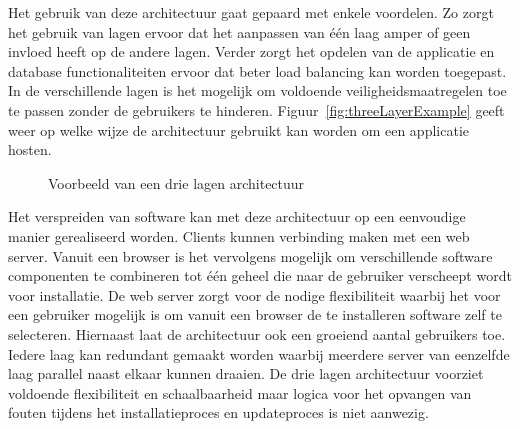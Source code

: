 Het gebruik van deze architectuur gaat gepaard met enkele voordelen.
Zo zorgt het gebruik van lagen ervoor dat het aanpassen van één laag amper of geen invloed heeft op de andere lagen.
Verder zorgt het opdelen van de applicatie en database functionaliteiten ervoor dat beter load balancing kan worden toegepast.
In de verschillende lagen is het mogelijk om voldoende veiligheidsmaatregelen toe te passen zonder de gebruikers te hinderen.
Figuur~\vref{fig:threeLayerExample} geeft weer op welke wijze de architectuur gebruikt kan worden om een applicatie hosten.

\begin{figure}[!ht]
\centering
{}
\caption{Voorbeeld van een drie lagen architectuur \citep{hanson2000client}}
\label{fig:threeLayerExample}
\end{figure}

Het verspreiden van software kan met deze architectuur op een eenvoudige manier gerealiseerd worden.
Clients kunnen verbinding maken met een web server.
Vanuit een browser is het vervolgens mogelijk om verschillende software componenten te combineren tot één geheel die naar de gebruiker verscheept wordt voor installatie.
De web server zorgt voor de nodige flexibiliteit waarbij het voor een gebruiker mogelijk is om vanuit een browser de te installeren software zelf te selecteren.
Hiernaast laat de architectuur ook een groeiend aantal gebruikers toe.
Iedere laag kan redundant gemaakt worden waarbij meerdere server van eenzelfde laag parallel naast elkaar kunnen draaien.
De drie lagen architectuur voorziet voldoende flexibiliteit en schaalbaarheid maar logica voor het opvangen van fouten tijdens het installatieproces en updateproces is niet aanwezig.

